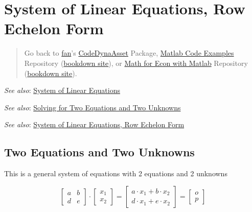 \documentclass[
]{book}
\begin{document}
\hypertarget{system-of-linear-equations-row-echelon-form}{%
\section{System of Linear Equations, Row Echelon Form}\label{system-of-linear-equations-row-echelon-form}}

\begin{quote}
Go back to \href{http://fanwangecon.github.io/}{fan}'s \href{https://fanwangecon.github.io/CodeDynaAsset/}{CodeDynaAsset} Package, \href{https://fanwangecon.github.io/M4Econ/}{Matlab Code Examples} Repository (\href{https://fanwangecon.github.io/M4Econ/bookdown}{bookdown site}), or \href{https://fanwangecon.github.io/Math4Econ/}{Math for Econ with Matlab} Repository (\href{https://fanwangecon.github.io/Math4Econ/bookdown}{bookdown site}).
\end{quote}

\emph{See also}: \href{https://fanwangecon.github.io/Math4Econ/matrix_system_of_equations/matrix_linear_equations.html}{System of Linear
Equations}

\emph{See also}: \href{https://fanwangecon.github.io/Math4Econ/matrix_system_of_equations/matrix_linear_system_2.html}{Solving for Two Equations and Two
Unknowns}

\emph{See also}: \href{https://fanwangecon.github.io/Math4Econ/matrix_system_of_equations/matrix_row_echelon_form.html}{System of Linear Equations, Row Echelon
Form}

\hypertarget{two-equations-and-two-unknowns}{%
\subsection{Two Equations and Two Unknowns}\label{two-equations-and-two-unknowns}}

This is a general system of equations with 2 equations and 2 unknowns

\[\left\lbrack \begin{array}{cc}
a & b\\
d & e
\end{array}\right\rbrack \cdot \left\lbrack \begin{array}{c}
x_1 \\
x_2 
\end{array}\right\rbrack =\left\lbrack \begin{array}{cc}
a\cdot x_1 +b\cdot x_2 \\
d\cdot x_1 +e\cdot x_2 
\end{array}\right\rbrack =\left\lbrack \begin{array}{c}
o\\
p
\end{array}\right\rbrack\]
\end{document}
